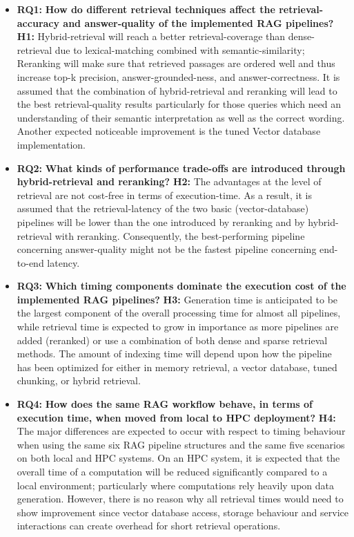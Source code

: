 \begin{itemize}
    \item {\bfseries RQ1:}
    \textbf{How do different retrieval techniques affect the retrieval-accuracy and answer-quality of the implemented \ac{RAG} pipelines?}\newline
    {\bf H1:} 
    Hybrid-retrieval will reach a better retrieval-coverage than dense-retrieval due to lexical-matching combined with semantic-similarity; Reranking will make sure that retrieved passages are ordered well and thus increase top-k precision, answer-grounded-ness, and answer-correctness. It is assumed that the combination of hybrid-retrieval and reranking will lead to the best retrieval-quality results particularly for those queries which need an understanding of their semantic interpretation as well as the correct wording. Another expected noticeable improvement is the tuned Vector database implementation.
    
    \item {\bfseries RQ2:}
    \textbf{What kinds of performance trade-offs are introduced through hybrid-retrieval and reranking?}\newline
    {\bfseries H2:} 
    The advantages at the level of retrieval are not cost-free in terms of execution-time. As a result, it is assumed that the retrieval-latency of the two basic (vector-database) pipelines will be lower than the one introduced by reranking and by hybrid-retrieval with reranking. Consequently, the best-performing pipeline concerning answer-quality might not be the fastest pipeline concerning end-to-end latency.
    
    \item {\bfseries RQ3:}
    \textbf{Which timing components dominate the execution cost of the implemented \ac{RAG} pipelines?}\newline
    {\bfseries H3:} 
    Generation time is anticipated to be the largest component of the overall processing time for almost all pipelines, while retrieval time is expected to grow in importance as more pipelines are added (reranked) or use a combination of both dense and sparse retrieval methods. The amount of indexing time will depend upon how the pipeline has been optimized for either in memory retrieval, a vector database, tuned chunking, or hybrid retrieval.
    
    \item {\bfseries RQ4:}
    \textbf{How does the same \ac{RAG} workflow behave, in terms of execution time, when moved from local to \ac{HPC} deployment?}\newline
    {\bfseries H4:} 
    The major differences are expected to occur with respect to timing behaviour when using the same six \ac{RAG} pipeline structures and the same five scenarios on both local and \ac{HPC} systems. On an \ac{HPC} system, it is expected that the overall time of a computation will be reduced significantly compared to a local environment; particularly where computations rely heavily upon data generation. However, there is no reason why all retrieval times would need to show improvement since vector database access, storage behaviour and service interactions can create overhead for short retrieval operations.
\end{itemize}

